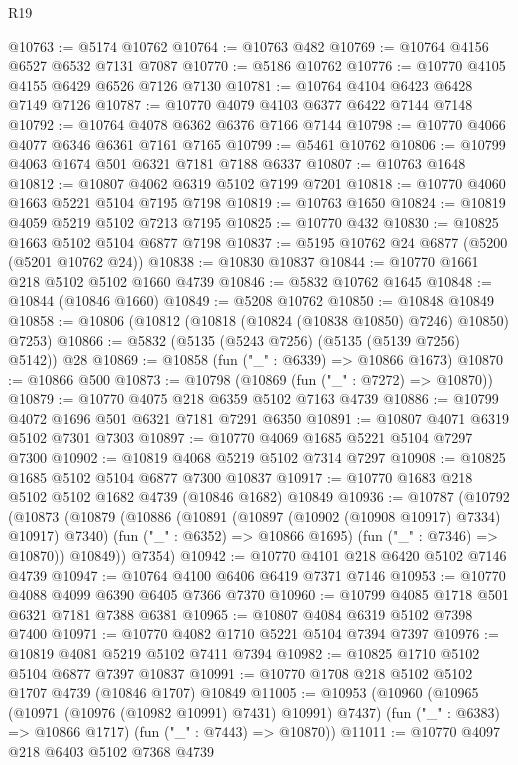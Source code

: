 \begin{lexlean}{R19}
\begin{coremodule}
{{{{{{{{{{{@10763 := @5174 @10762
@10764 := @10763 @482
@10769 := @10764 @4156 @6527 @6532 @7131 @7087
@10770 := @5186 @10762
@10776 := @10770 @4105 @4155 @6429 @6526 @7126 @7130
@10781 := @10764 @4104 @6423 @6428 @7149 @7126
@10787 := @10770 @4079 @4103 @6377 @6422 @7144 @7148
@10792 := @10764 @4078 @6362 @6376 @7166 @7144
@10798 := @10770 @4066 @4077 @6346 @6361 @7161 @7165
@10799 := @5461 @10762
@10806 := @10799 @4063 @1674 @501 @6321 @7181 @7188 @6337
@10807 := @10763 @1648
@10812 := @10807 @4062 @6319 @5102 @7199 @7201
@10818 := @10770 @4060 @1663 @5221 @5104 @7195 @7198
@10819 := @10763 @1650
@10824 := @10819 @4059 @5219 @5102 @7213 @7195
@10825 := @10770 @432
@10830 := @10825 @1663 @5102 @5104 @6877 @7198
@10837 := @5195 @10762 @24 @6877 (@5200 (@5201 @10762 @24))
@10838 := @10830 @10837
@10844 := @10770 @1661 @218 @5102 @5102 @1660 @4739
@10846 := @5832 @10762 @1645
@10848 := @10844 (@10846 @1660)
@10849 := @5208 @10762
@10850 := @10848 @10849
@10858 := @10806 (@10812 (@10818 (@10824 (@10838 @10850) @7246) @10850) @7253)
@10866 := @5832 (@5135 (@5243 @7256) (@5135 (@5139 @7256) @5142)) @28
@10869 := @10858 (fun ("_" : @6339) => @10866 @1673)
@10870 := @10866 @500
@10873 := @10798 (@10869 (fun ("_" : @7272) => @10870))
@10879 := @10770 @4075 @218 @6359 @5102 @7163 @4739
@10886 := @10799 @4072 @1696 @501 @6321 @7181 @7291 @6350
@10891 := @10807 @4071 @6319 @5102 @7301 @7303
@10897 := @10770 @4069 @1685 @5221 @5104 @7297 @7300
@10902 := @10819 @4068 @5219 @5102 @7314 @7297
@10908 := @10825 @1685 @5102 @5104 @6877 @7300 @10837
@10917 := @10770 @1683 @218 @5102 @5102 @1682 @4739 (@10846 @1682) @10849
@10936 := @10787
    (@10792
      (@10873
        (@10879
          (@10886
            (@10891 (@10897 (@10902 (@10908 @10917) @7334) @10917) @7340)
            (fun ("_" : @6352) => @10866 @1695)
            (fun ("_" : @7346) => @10870))
          @10849))
      @7354)
@10942 := @10770 @4101 @218 @6420 @5102 @7146 @4739
@10947 := @10764 @4100 @6406 @6419 @7371 @7146
@10953 := @10770 @4088 @4099 @6390 @6405 @7366 @7370
@10960 := @10799 @4085 @1718 @501 @6321 @7181 @7388 @6381
@10965 := @10807 @4084 @6319 @5102 @7398 @7400
@10971 := @10770 @4082 @1710 @5221 @5104 @7394 @7397
@10976 := @10819 @4081 @5219 @5102 @7411 @7394
@10982 := @10825 @1710 @5102 @5104 @6877 @7397 @10837
@10991 := @10770 @1708 @218 @5102 @5102 @1707 @4739 (@10846 @1707) @10849
@11005 := @10953
    (@10960
      (@10965 (@10971 (@10976 (@10982 @10991) @7431) @10991) @7437)
      (fun ("_" : @6383) => @10866 @1717)
      (fun ("_" : @7443) => @10870))
@11011 := @10770 @4097 @218 @6403 @5102 @7368 @4739
}}}}}}}}}}}
\end{coremodule}
\end{lexlean}
